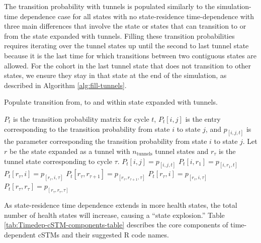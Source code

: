 \documentclass[
]{article}
\begin{document}
The transition probability with tunnels is populated similarly to the simulation-time dependence case for all states with no state-residence time-dependence with three main differences that involve the state or states that can transition to or from the state expanded with tunnels. Filling these transition probabilities requires iterating over the tunnel states up until the second to last tunnel state because it is the last time for which transitions between two contiguous states are allowed. For the cohort in the last tunnel state that does not transition to other states, we ensure they stay in that state at the end of the simulation, as described in Algorithm \ref{alg:fill-tunnels}.

\begin{algorithm}
\caption{Populate transition from, to and within state expanded with tunnels.}\label{alg:fill-tunnels}
\begin{algorithmic}
  \Ensure $P_t$ is the transition probability matrix for cycle $t$, $P_t[i, j]$ is the entry corresponding to the transition probability from state $i$ to state $j$, and $p_{[i,j,t]}$ is the parameter corresponding the transition probability from state $i$ to state $j$.
  \Ensure Let $r$ be the state expanded as a tunnel with $n_{\text{tunnels}}$ tunnel states and $r_{\tau}$ is the tunnel state corresponding to cycle $\tau$.
    \State $P_t[i, j] = p_{[i,j,t]}$ 
  \EndFor
    \State $P_t[i, r_{1}] = p_{[i,r_{1},t]}$
  \EndFor
      \State $P_t[r_{\tau}, i] = p_{[r_{\tau}, i,\tau]}$
      \State $P_t[r_{\tau}, r_{\tau+1}] = p_{[r_{\tau}, r_{\tau+1},\tau]}$
    \EndFor
      \State $P_t[r_{\tau}, i] = p_{[r_{\tau}, i,\tau]}$
      \State $P_t[r_{\tau}, r_{\tau}] = p_{[r_{\tau}, r_{\tau},\tau]}$
    \EndFor
  \EndFor
\end{algorithmic}
\end{algorithm}

As state-residence time dependence extends in more health states, the total number of health states will increase, causing a ``state explosion.'' Table \ref{tab:Timedep-cSTM-components-table} describes the core components of time-dependent cSTMs and their suggested R code names.
\end{document}
